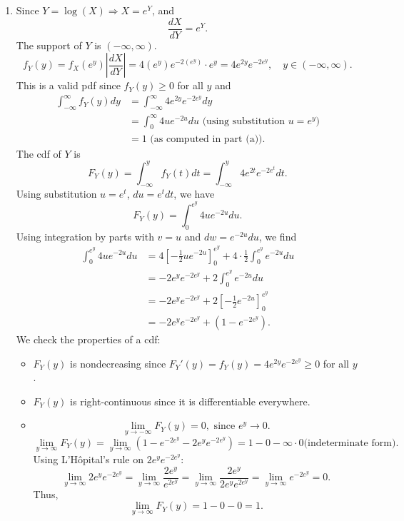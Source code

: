 \documentclass[12pt]{article}
\newenvironment{problem}[2][Problem]{\begin{trivlist}
\item[\hskip \labelsep {\bfseries #1}\hskip \labelsep {\bfseries #2.}]}
{\end{trivlist}}
\begin{document}
\begin{problem}{8}
\begin{enumerate}
\begin{center}
    \end{center}
    \item Since $Y = \log(X) \Rightarrow X = e^Y$, and
    \[
      \frac{dX}{dY} = e^Y.
    \]
    The support of $Y$ is $(-\infty, \infty)$.
    \[
      f_Y(y) = f_X(e^y) \left|\frac{dX}{dY}\right| =
      4(e^y)e^{-2(e^y)} \cdot e^y =
      4e^{2y}e^{-2e^y},\quad y \in (-\infty, \infty).
    \]
    This is a valid pdf since $f_Y(y) \ge 0$ for all $y$ and
    \[
    \begin{aligned}
      \int_{-\infty}^\infty f_Y(y) dy 
      &= \int_{-\infty}^\infty 4e^{2y}e^{-2e^y} dy \\
      &= \int_0^\infty 4u e^{-2u} du \text{ (using substitution } u = e^y) \\
      &= 1 \text{ (as computed in part (a)).}
    \end{aligned}
    \]
    The cdf of $Y$ is
    \[
      F_Y(y) = \int_{-\infty}^y f_Y(t) dt = \int_{-\infty}^y 4e^{2t}e^{-2e^t} dt.
    \]
    Using substitution $u = e^t$, $du = e^t dt$, we have
    \[
      F_Y(y) = \int_0^{e^y} 4u e^{-2u} du.
    \]
    Using integration by parts with $v = u$ and $dw = e^{-2u} du$, we find
    \[
    \begin{aligned}
      \int_0^{e^y} 4u e^{-2u} du 
      &= 4\left[-\frac{1}{2}ue^{-2u}\right]_0^{e^y} 
      + 4\cdot\frac{1}{2}\int_0^{e^y} e^{-2u} du \\
      &= -2e^y e^{-2e^y} + 2\int_0^{e^y} e^{-2u} du \\
      &= -2e^y e^{-2e^y} + 2\left[-\frac{1}{2}e^{-2u}\right]_0^{e^y} \\
      &= -2e^y e^{-2e^y} + (1 - e^{-2e^y}).
    \end{aligned}
    \]
    We check the properties of a cdf:
    \begin{itemize}
      \item[i.] $F_Y(y)$ is nondecreasing since $F_Y'(y) = f_Y(y) = 4e^{2y}e^{-2e^y} \ge 0$ for all $y$.
      \item[ii.] $F_Y(y)$ is right-continuous since it is differentiable everywhere.
      \item[iii.] 
      \[
        \lim_{y \to -\infty} F_Y(y) = 0, \text{ since } e^y \to 0.
      \]
      \[
        \lim_{y \to \infty} F_Y(y) 
        = \lim_{y \to \infty} (1 - e^{-2e^y} - 2e^y e^{-2e^y}) 
        = 1 - 0 - \infty \cdot 0 \text{(indeterminate form)}.
      \]
      Using L'Hôpital's rule on $2e^y e^{-2e^y}$:
      \[
        \lim_{y \to \infty} 2e^y e^{-2e^y} 
        = \lim_{y \to \infty} \frac{2e^y}{e^{2e^y}} 
        = \lim_{y \to \infty} \frac{2e^y}{2e^y e^{2e^y}} 
        = \lim_{y \to \infty} e^{-2e^y} = 0.
      \]
      Thus,
      \[
        \lim_{y \to \infty} F_Y(y) = 1 - 0 - 0 = 1.
      \]
    \end{itemize}
  \end{enumerate}
\end{problem}

\end{document}
